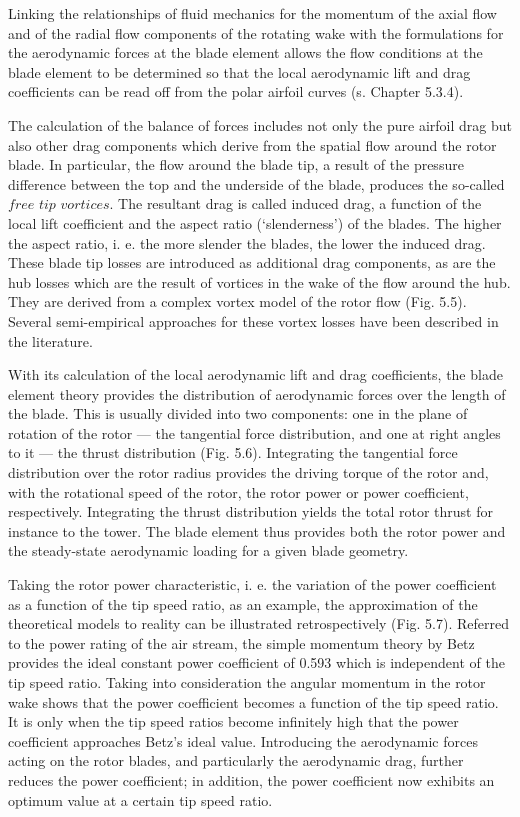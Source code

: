 Linking the relationships of fluid mechanics for the momentum of the axial flow and of the radial flow components of the rotating wake with the formulations for the aerodynamic forces at the blade element allows the flow conditions at the blade element to be determined so that the local aerodynamic lift and drag coefficients can be read off from the polar airfoil
curves (s. Chapter 5.3.4).

The calculation of the balance of forces includes not only the pure airfoil drag but also other drag components which derive from the spatial flow around the rotor blade. In particular, the flow around the blade tip, a result of the pressure difference between the top and the underside of the blade, produces the so-called $free$ $tip$ $vortices$. The resultant drag is called induced drag, a function of the local lift coefficient and the aspect ratio (‘slenderness’) of the blades. The higher the aspect ratio, i. e. the more slender the blades, the lower the induced drag. These blade tip losses are introduced as additional drag components, as are the hub losses which are the result of vortices in the wake of the flow around the hub. They are derived from a complex vortex model of the rotor flow (Fig. 5.5). Several semi-empirical approaches for these vortex losses have been described in the literature.

With its calculation of the local aerodynamic lift and drag coefficients, the blade element theory provides the distribution of aerodynamic forces over the length of the blade. This is usually divided into two components: one in the plane of rotation of the rotor — the tangential force distribution, and one at right angles to it — the thrust distribution (Fig. 5.6). Integrating the tangential force distribution over the rotor radius provides the driving torque of the rotor and, with the rotational speed of the rotor, the rotor power or power coefficient, respectively. Integrating the thrust distribution yields the total rotor thrust for instance to the tower. The blade element thus provides both the rotor power and the steady-state aerodynamic loading for a given blade geometry.

Taking the rotor power characteristic, i. e. the variation of the power coefficient as a function of the tip speed ratio, as an example, the approximation of the theoretical models to reality can be illustrated retrospectively (Fig. 5.7). Referred to the power rating of the air stream, the simple momentum theory by Betz provides the ideal constant power coefficient of 0.593 which is independent of the tip speed ratio. Taking into consideration the angular momentum in the rotor wake shows that the power coefficient becomes a function of the tip speed ratio. It is only when the tip speed ratios become infinitely high that the power coefficient approaches Betz’s ideal value. Introducing the aerodynamic forces acting on the rotor blades, and particularly the aerodynamic drag, further reduces the power coefficient; in addition, the power coefficient now exhibits an optimum value at a certain tip speed ratio.

